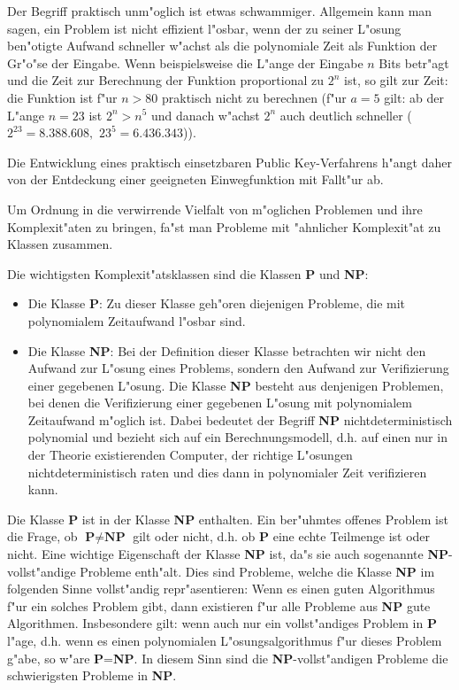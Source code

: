 Der Begriff \glqq praktisch unm"oglich\grqq {} ist etwas schwammiger. Allgemein kann man sagen, ein Problem ist  nicht effizient l"osbar, wenn der zu seiner L"osung ben"otigte Aufwand schneller w"achst als die polynomiale Zeit als Funktion der Gr"o"se der Eingabe. Wenn beispielsweise die L"ange der Eingabe $ n $  Bits betr"agt und die Zeit  zur Berechnung der Funktion proportional zu $ 2^n $ ist, so gilt zur Zeit: die Funktion ist f"ur $n > 80$ praktisch nicht zu berechnen (f"ur $ a=5 $ gilt: ab der L"ange $ n=23 $ ist $ 2^n > n^5 $ und danach w"achst $ 2^n $ auch deutlich schneller ($ 2^{23}=8.388.608, $ $ 23^5= 6.436.343 $)).\par 

Die Entwicklung eines praktisch einsetzbaren Public Key-Verfahrens h"angt daher von der Entdeckung einer geeigneten Einwegfunktion mit Fallt"ur ab.\par

Um Ordnung in die verwirrende Vielfalt von m"oglichen Problemen und ihre Komplexit"aten zu bringen, fa"st man Probleme mit "ahnlicher Komplexit"at zu Klassen zusammen.

Die wichtigsten Komplexit"atsklassen  sind die Klassen \textbf{P} und \textbf{NP}: 

\begin{itemize}

    \item Die Klasse \textbf{P}: Zu dieser Klasse geh"oren diejenigen Probleme, die mit polynomialem Zeitaufwand l"osbar sind.
    
    \item Die Klasse \textbf{NP}: Bei der Definition dieser Klasse betrachten wir nicht den Aufwand zur L"osung eines Problems, sondern den Aufwand zur Verifizierung einer gegebenen L"osung. Die Klasse \textbf{NP} besteht aus denjenigen Problemen, bei denen die Verifizierung einer gegebenen L"osung mit polynomialem Zeitaufwand m"oglich ist. Dabei bedeutet der Begriff \textbf{NP} \glqq nichtdeterministisch\grqq {} polynomial und bezieht sich auf ein Berechnungsmodell, d.h. auf einen nur in der Theorie existierenden Computer, der richtige L"osungen nichtdeterministisch \glqq raten\grqq {} und dies dann in polynomialer Zeit verifizieren kann.

\end{itemize}

Die Klasse \textbf{P} ist in der Klasse \textbf{NP} enthalten. Ein ber"uhmtes offenes Problem ist die Frage, ob $ \textbf{P} \neq \textbf{NP} $ gilt oder nicht, d.h. ob \textbf{P} eine echte Teilmenge ist oder nicht. Eine wichtige Eigenschaft der Klasse \textbf{NP} ist, da"s sie auch sogenannte \glqq \textbf{NP}-vollst"andige\grqq {} Probleme enth"alt. Dies sind Probleme, welche die Klasse \textbf{NP} im folgenden Sinne vollst"andig repr"asentieren: Wenn es einen \glqq guten\grqq {} Algorithmus f"ur ein solches Problem gibt, dann existieren f"ur alle Probleme aus \textbf{NP} \glqq gute\grqq {} Algorithmen. Insbesondere gilt: wenn auch nur ein vollst"andiges Problem in \textbf{P} l"age, d.h. wenn es einen polynomialen L"osungsalgorithmus f"ur dieses Problem g"abe, so w"are \textbf{P}=\textbf{NP}. In diesem Sinn sind die \textbf{NP}-vollst"andigen Probleme die schwierigsten Probleme in \textbf{NP}.

